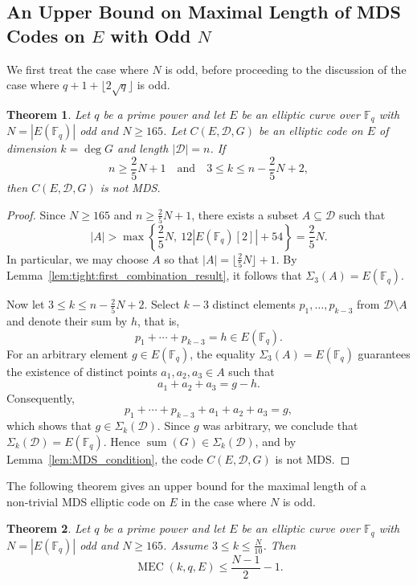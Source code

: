 \documentclass[journal,12pt,onecolumn]{IEEEtran}
\newtheorem{theorem}{Theorem}
\newcommand{\Point}{\operatorname{sum}}
\newcommand{\sumset}{\Sigma}
\begin{document}
\subsection{An Upper Bound on Maximal Length of MDS Codes on $E$ with Odd $N$}

We first treat the case where $N$ is odd, before proceeding to the discussion of the case where $q+1+\lfloor 2\sqrt{q}\rfloor$ is odd.

\begin{theorem}\label{thm:E(Fq)_is_odd}
Let $q$ be a prime power and let $E$ be an elliptic curve over $\mathbb{F}_q$ with $N = |E(\mathbb{F}_q)|$ odd and $N \ge 165$. Let $C(E, \mathcal{D}, G)$ be an elliptic code on $E$ of dimension $k=\deg G$ and length $|\mathcal{D}| = n$. If
\[
n \ge \frac{2}{5}N + 1 \quad \text{and} \quad 3 \le k \le n - \frac{2}{5}N + 2,
\]
then $C(E, \mathcal{D}, G)$ is not MDS.
\end{theorem}


\begin{proof}
Since $N \ge 165$ and $n \ge \frac{2}{5}N + 1$, there exists a subset $A \subseteq \mathcal{D}$ such that
\[
|A| > \max\left\{ \frac{2}{5}N,\ 12|E(\mathbb{F}_q)[2]| + 54 \right\} = \frac{2}{5}N.
\]
In particular, we may choose $A$ so that $|A| = \lfloor\frac{2}{5}N \rfloor + 1$.
By Lemma~\ref{lem:tight:first_combination_result}, it follows that $\sumset_3(A) = E(\mathbb{F}_q)$.

Now let $3 \le k \le n - \frac{2}{5}N + 2$. Select $k-3$ distinct elements $p_1, \dots, p_{k-3}$ from $\mathcal{D} \setminus A$ and denote their sum by $h$, that is,
\[
p_1 + \cdots + p_{k-3} = h \in E(\mathbb{F}_q).
\]
For an arbitrary element $g \in E(\mathbb{F}_q)$, the equality $\sumset_3(A) = E(\mathbb{F}_q)$ guarantees the existence of distinct points $a_1, a_2, a_3 \in A$ such that
\[
a_1 + a_2 + a_3 = g - h.
\]
Consequently,
\[
p_1 + \cdots + p_{k-3} + a_1 + a_2 + a_3 = g,
\]
which shows that $g \in \sumset_k(\mathcal{D})$. Since $g$ was arbitrary, we conclude that $\sumset_k(\mathcal{D}) = E(\mathbb{F}_q)$. Hence $\Point(G) \in \sumset_k(\mathcal{D})$, and by Lemma~\ref{lem:MDS_condition}, the code $C(E, \mathcal{D}, G)$ is not MDS.
\end{proof}


The following theorem gives an upper bound for the maximal length of a non‑trivial MDS elliptic code on $E$ in the case where $N$ is odd.

\begin{theorem}\label{thm:main_theorem_2}
Let $q$ be a prime power and let $E$ be an elliptic curve over $\mathbb{F}_q$ with $N = |E(\mathbb{F}_q)|$ odd and $N \ge 165$. Assume $3 \le k \le \frac{N}{10}$. Then
\[
\operatorname{MEC}(k, q, E) \le \frac{N - 1}{2} - 1.
\]
\end{theorem}
\end{document}
